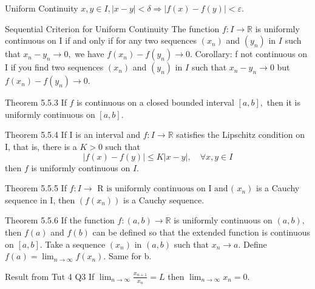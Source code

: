 \documentclass[10pt,landscape]{article}
\theoremstyle{definition}
\newcommand{\thistheoremname}{}
\newtheorem*{genericthm*}{\thistheoremname}
\newenvironment{namedthm*}[1]
{\renewcommand{\thistheoremname}{#1}\begin{genericthm*}}
{\end{genericthm*}}
\begin{document}
\begin{multicols}{3}
	\begin{namedthm*}{Uniform Continuity}
		\(x, y \in I,|x-y|<\delta \Longrightarrow|f(x)-f(y)|<\varepsilon\).
	\end{namedthm*}

	\begin{namedthm*}{Sequential Criterion for Uniform Continuity}
		The function \(f: I \rightarrow \mathbb{R}\) is uniformly continuous on I if and only if for any two sequences \(\left(x_{n}\right)\) and \(\left(y_{n}\right)\)
		in \(I\) such that \(x_{n}-y_{n} \rightarrow 0,\) we have \(f\left(x_{n}\right)-f\left(y_{n}\right) \rightarrow 0\). Corollary: f not continuous on I if you find two sequences \(\left(x_{n}\right)\) and \(\left(y_{n}\right)\) in \(I\) such that \(x_{n}-y_{n} \rightarrow 0\) but \(f\left(x_{n}\right)-f\left(y_{n}\right) \rightarrow 0\).
	\end{namedthm*}

	\begin{namedthm*}{Theorem 5.5.3}
		If \(f\) is continuous on a closed bounded interval \([a, b],\) then it is uniformly continuous
		on \([a, b] .\)
	\end{namedthm*}

	\begin{namedthm*}{Theorem 5.5.4}
		If I is an interval and \(f: I \rightarrow \mathbb{R}\) satisfies the Lipschitz condition on I, that is, there
		is a \(K>0\) such that
		\[
			|f(x)-f(y)| \leq K|x-y|, \quad \forall x, y \in I
		\]
		then \(f\) is uniformly continuous on \(I .\)
	\end{namedthm*}

	\begin{namedthm*}{Theorem 5.5.5}
		If \(\left.f: I \rightarrow \text { R is uniformly continuous on I and ( } x_{n}\right)\) is a Cauchy sequence in I, then
		\(\left(f\left(x_{n}\right)\right)\) is a Cauchy sequence.
	\end{namedthm*}

	\begin{namedthm*}{Theorem 5.5.6}
		If the function \(f:(a, b) \rightarrow \mathbb{R}\) is uniformly continuous on \((a, b),\) then \(f(a)\) and \(f(b)\)
		can be defined so that the extended function is continuous on \([a, b] .\) Take a sequence \(\left(x_{n}\right)\) in \((a, b)\) such that \(x_{n} \rightarrow a\). Define \(f(a)=\lim _{n \rightarrow \infty} f\left(x_{n}\right)\). Same for b.
	\end{namedthm*}

	\begin{namedthm*}{Result from Tut 4 Q3}
		If \(\lim _{n \rightarrow \infty} \frac{x_{n+1}}{x_{n}}=L\) then \(\lim _{n \rightarrow \infty} x_{n}=0\).
	\end{namedthm*}


\end{multicols}
\end{document}
